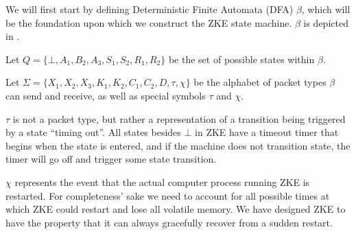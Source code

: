 \documentclass{article}
\begin{document}
\begin{definition}\label{def:automata}
	We will first start by defining Deterministic Finite Automata (DFA) $\beta$, which will be the foundation upon which we construct the ZKE state machine. $\beta$ is depicted in .

	Let $Q = \{\bot, A_1, B_2, A_3, S_1, S_2, R_1, R_2\}$ be the set of possible states within $\beta$.

	Let $\Sigma = \{X_1, X_2, X_3, K_1, K_2, C_1, C_2, D, \tau, \chi\}$ be the alphabet of packet types $\beta$ can send and receive, as well as special symbols $\tau$ and $\chi$.

	$\tau$ is not a packet type, but rather a representation of a transition being triggered by a state ``timing out''. All states besides $\bot$ in ZKE have a timeout timer that begins when the state is entered, and if the machine does not transition state, the timer will go off and trigger some state transition.

	$\chi$ represents the event that the actual computer process running ZKE is restarted. For completeness' sake we need to account for all possible times at which ZKE could restart and lose all volatile memory. We have designed ZKE to have the property that it can always gracefully recover from a sudden restart.


\end{definition}
\end{document}
